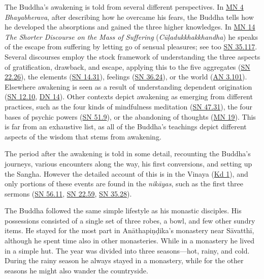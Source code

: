 \documentclass[12pt,openany]{book}%
\begin{document}
The Buddha’s awakening is told from several different perspectives. In \href{https://suttacentral.net/mn4}{MN 4} \textit{Bhayabherava}, after describing how he overcame his fears, the Buddha tells how he developed the absorptions and gained the three higher knowledges. In \href{https://suttacentral.net/mn14}{MN 14} \textit{The Shorter Discourse on the Mass of Suffering} (\textit{\textsanskrit{Cūḷadukkhakkhandha}}) he speaks of the escape from suffering by letting go of sensual pleasures; see too \href{https://suttacentral.net/sn35.117}{SN 35.117}. Several discourses employ the stock framework of understanding the three aspects of gratification, drawback, and escape, applying this to the five aggregates (\href{https://suttacentral.net/sn22.26}{SN 22.26}), the elements (\href{https://suttacentral.net/sn14.31}{SN 14.31}), feelings (\href{https://suttacentral.net/sn36.24}{SN 36.24}), or the world (\href{https://suttacentral.net/an3.101}{AN 3.101}). Elsewhere awakening is seen as a result of understanding dependent origination (\href{https://suttacentral.net/sn12.10}{SN 12.10}, \href{https://suttacentral.net/dn14}{DN 14}). Other contexts depict awakening as emerging from different practices, such as the four kinds of mindfulness meditation (\href{https://suttacentral.net/sn47.31}{SN 47.31}), the four bases of psychic powers (\href{https://suttacentral.net/sn51.9}{SN 51.9}), or the abandoning of thoughts (\href{https://suttacentral.net/mn19}{MN 19}). This is far from an exhaustive list, as all of the Buddha's teachings depict different aspects of the wisdom that stems from awakening.

The period after the awakening is told in some detail, recounting the Buddha’s journeys, various encounters along the way, his first conversions, and setting up the Sangha. However the detailed account of this is in the Vinaya (\href{https://suttacentral.net/pli{-}tv{-}kd1}{Kd 1}), and only portions of these events are found in the \textit{\textsanskrit{nikāyas}}, such as the first three sermons (\href{https://suttacentral.net/sn56.11}{SN 56.11}, \href{https://suttacentral.net/sn22.59}{SN 22.59}, \href{https://suttacentral.net/sn35.28}{SN 35.28}).

The Buddha followed the same simple lifestyle as his monastic disciples. His possessions consisted of a single set of three robes, a bowl, and few other sundry items. He stayed for the most part in \textsanskrit{Anāthapiṇḍika}’s monastery near \textsanskrit{Sāvatthī}, although he spent time also in other monasteries. While in a monastery he lived in a simple hut. The year was divided into three seasons—hot, rainy, and cold. During the rainy season he always stayed in a monastery, while for the other seasons he might also wander the countryside.
\end{document}
